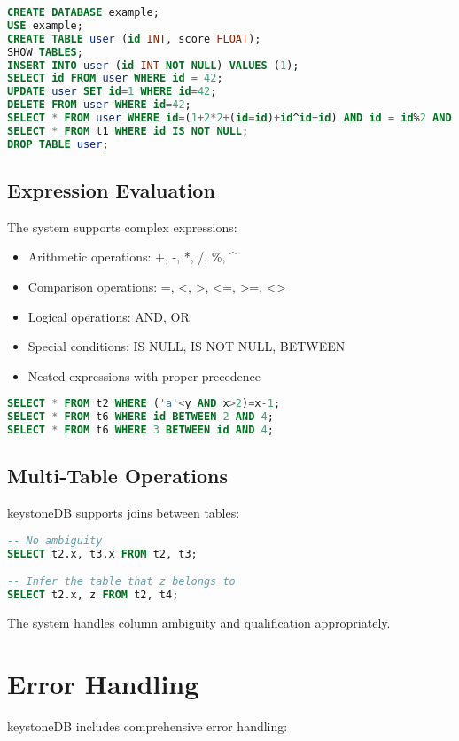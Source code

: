 \documentclass[12pt,a4paper]{article}
\begin{document}
\begin{lstlisting}[language=SQL,caption=Examples of supported SQL statements]
CREATE DATABASE example;
USE example;
CREATE TABLE user (id INT, score FLOAT);
SHOW TABLES;
INSERT INTO user (id INT NOT NULL) VALUES (1);
SELECT id FROM user WHERE id = 42;
UPDATE user SET id=1 WHERE id=42;
DELETE FROM user WHERE id=42;
SELECT * FROM user WHERE id=(1+2*2+(id=id)+id^id+id) AND id = id%2 AND id IS NOT NULL;
SELECT * FROM t1 WHERE id IS NOT NULL;
DROP TABLE user;
\end{lstlisting}

\subsection{Expression Evaluation}
The system supports complex expressions:

\begin{itemize}
    \item Arithmetic operations: +, -, *, /, \%, \^
    \item Comparison operations: =, <, >, <=, >=, <>
    \item Logical operations: AND, OR
    \item Special conditions: IS NULL, IS NOT NULL, BETWEEN
    \item Nested expressions with proper precedence
\end{itemize}

\begin{lstlisting}[language=SQL,caption=Examples of complex expressions]
SELECT * FROM t2 WHERE ('a'<y AND x>2)=x-1;
SELECT * FROM t6 WHERE id BETWEEN 2 AND 4;
SELECT * FROM t6 WHERE 3 BETWEEN id AND 4;
\end{lstlisting}

\subsection{Multi-Table Operations}
keystoneDB supports joins between tables:

\begin{lstlisting}[language=SQL,caption=Examples of multi-table operations]
-- No ambiguity
SELECT t2.x, t3.x FROM t2, t3;

-- Infer the table that z belongs to
SELECT t2.x, z FROM t2, t4;
\end{lstlisting}

The system handles column ambiguity and qualification appropriately.

\section{Error Handling}
keystoneDB includes comprehensive error handling:
\end{document}
